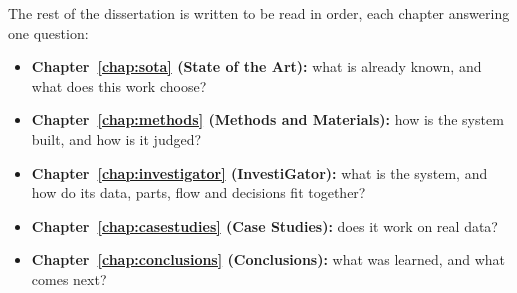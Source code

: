 The rest of the dissertation is written to be read in order, each chapter answering one question:

\begin{itemize}
  \item \textbf{Chapter~\ref{chap:sota} (State of the Art):} what is already known, and what does this
        work choose?
  \item \textbf{Chapter~\ref{chap:methods} (Methods and Materials):} how is the system built, and how is
        it judged?
  \item \textbf{Chapter~\ref{chap:investigator} (InvestiGator):} what is the system, and how do its data, parts,
        flow and decisions fit together?
  \item \textbf{Chapter~\ref{chap:casestudies} (Case Studies):} does it work on real data?
  \item \textbf{Chapter~\ref{chap:conclusions} (Conclusions):} what was learned, and what comes next?
\end{itemize}
